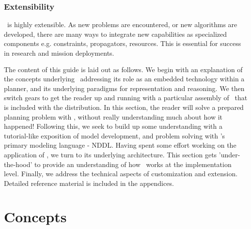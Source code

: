 \documentclass[10pt, letterpaper, twoside]{article}
\begin{document}
\subsubsection{Extensibility} \ET\, is highly extensible. As new problems are
encountered, or new algorithms are developed, there are many ways to
integrate new capabilities as specialized components e.g. constraints,
propagators, resources. This is essential for success in research and
mission deployments. 

The content of this guide is laid out as follows. We begin with an
explanation of the concepts underlying \ET\, addressing its role as
an embedded technology within a planner, and its underlying paradigms
for representation and reasoning. We then switch gears to get the
reader up and running with a particular assembly of \ET\, that is
included with the distribution. In this section, the reader will solve
a prepared planning problem with \ET, without really understanding
much about how it happened! Following this, we seek to build up some
understanding with a tutorial-like exposition of model development,
and problem solving with \ET's primary modeling language -
NDDL. Having spent some effort working on the application of \ET,
we turn to its underlying architecture. This section gets
'under-the-hood' to provide an understanding of how \ET\, works at
the implementation level.  Finally, we address the technical aspects
of customization and extension. Detailed reference material is
included in the appendices.

\section{Concepts}
\label{concepts}
\end{document}

